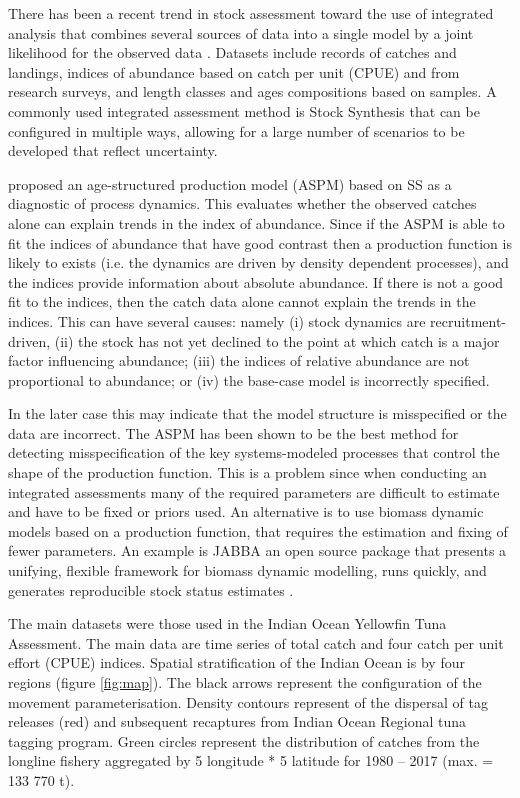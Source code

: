 
There has been a recent trend in stock assessment toward the use of integrated analysis that combines several sources of data into a single model by a joint likelihood for the observed data \citep[e.g.][]{doubleday1976least,fournier1982general,maunder2013review}. Datasets include records of catches and landings, indices of abundance based on catch per unit (CPUE) and from research surveys, and length classes and ages compositions based on samples. A commonly used integrated assessment method is Stock Synthesis \citep[SS3,][]{methot2013stock} that can be configured in multiple ways, allowing for a large number of scenarios to be developed that reflect uncertainty.

\cite{Maunder2015} proposed an age-structured production model (ASPM) based on SS as a diagnostic of process dynamics. This evaluates whether the observed catches alone can explain trends in the index of abundance. Since if the ASPM is able to fit the indices of abundance that have good contrast then a production function is likely to exists (i.e. the dynamics are driven by density dependent processes), and the indices provide information about absolute abundance. If  there is not a good fit to the indices, then the catch data alone cannot explain the trends in the indices. This can have several causes: namely (i) stock dynamics are recruitment-driven, (ii) the stock has not yet declined to the point at which catch is a major factor influencing abundance; (iii) the indices of relative abundance are not proportional to abundance; or (iv) the base-case model is incorrectly specified.

In the later case this may indicate that the model structure is misspecified or the data are incorrect. The ASPM has been shown \citep{carvalho2017can} to be the best method for detecting misspecification of the key systems-modeled processes that control the shape of the production function. This is a problem since when conducting an integrated assessments many of the required parameters are difficult to estimate \citep[e.g.][]{lee2011m,lee2012steepness} and have to be fixed or priors used. An alternative is to use biomass dynamic models based on a production function, that requires the estimation and fixing of fewer parameters. An example is JABBA an open source package that presents a unifying, flexible framework for biomass dynamic modelling, runs quickly, and generates reproducible stock status estimates \citep{winker2018jabba}.

The main datasets were those used in the Indian Ocean Yellowfin Tuna Assessment. The main data are time series of total catch and four catch per unit effort (CPUE) indices. Spatial stratification of the Indian Ocean is by four regions (figure \ref{fig:map}). The black arrows represent the configuration of the movement parameterisation.  Density contours represent of the dispersal of tag releases (red) and subsequent recaptures from Indian Ocean Regional tuna tagging program. Green circles represent the distribution of catches from the longline fishery aggregated by 5 longitude * 5 latitude for 1980 – 2017 (max. = 133 770 t).


